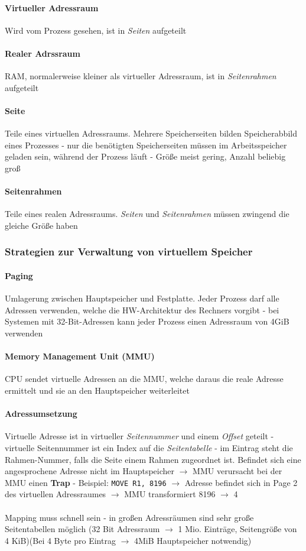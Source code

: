 \documentclass[10pt,a4paper,landscape]{article}
\begin{document}
\begin{multicols*}{3}
	\paragraph{Virtueller Adressraum} Wird vom Prozess gesehen, ist in \textit{Seiten} aufgeteilt
	\paragraph{Realer Adrssraum} RAM, normalerweise kleiner als virtueller Adressraum, ist in \textit{Seitenrahmen} aufgeteilt
	\paragraph{Seite} Teile eines virtuellen Adressraums. Mehrere Speicherseiten bilden Speicherabbild eines Prozesses - nur die benötigten Speicherseiten müssen im Arbeitsspeicher geladen sein, während der Prozess läuft - Größe meist gering, Anzahl beliebig groß
	\paragraph{Seitenrahmen} Teile eines realen Adressraums. \textit{Seiten} und \textit{Seitenrahmen} müssen zwingend die gleiche Größe haben
	\subsubsection{Strategien zur Verwaltung von virtuellem Speicher}
	\paragraph{Paging} Umlagerung zwischen Hauptspeicher und Festplatte. Jeder Prozess darf alle Adressen verwenden, welche die HW-Architektur des Rechners vorgibt - bei Systemen mit 32-Bit-Adressen kann jeder Prozess einen Adressraum von 4GiB verwenden
	\paragraph{Memory Management Unit (MMU)} CPU sendet virtuelle Adressen an die MMU, welche daraus die reale Adresse ermittelt und sie an den Hauptspeicher weiterleitet
	\paragraph{Adressumsetzung} Virtuelle Adresse ist in virtueller \textit{Seitennummer} und einem \textit{Offset} geteilt - virtuelle Seitennummer ist ein Index auf die \textit{Seitentabelle} - im Eintrag steht die Rahmen-Nummer, falls die Seite einem Rahmen zugeordnet ist. Befindet sich eine angesprochene Adresse nicht im Hauptspeicher $\rightarrow$ MMU verursacht bei der MMU einen \textbf{Trap} - Beispiel: \texttt{MOVE R1, 8196} $\rightarrow$ Adresse befindet sich in Page 2 des virtuellen Adressraumes $\rightarrow$ MMU transformiert 8196 $\rightarrow$ 4\\\\
	Mapping muss schnell sein - in großen Adressräumen sind sehr große Seitentabellen möglich (32 Bit Adressraum $\rightarrow$ 1 Mio. Einträge, Seitengröße von 4 KiB)(Bei 4 Byte pro Eintrag $\rightarrow$ 4MiB Hauptspeicher notwendig)

\end{multicols*}
\end{document}
